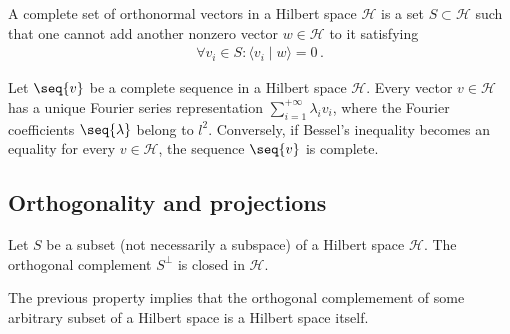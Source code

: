     \begin{adefinition}
        A complete set of orthonormal vectors in a Hilbert space $\mathcal{H}$ is a set $S\subset\mathcal{H}$ such that one cannot add another nonzero vector $w\in\mathcal{H}$ to it satisfying
        \begin{gather}
            \forall v_i\in S:\langle v_i\mid w\rangle = 0\,.
        \end{gather}
    \end{adefinition}

    \begin{theorem}[Parceval]
        Let $\seq{v}$ be a complete sequence in a Hilbert space $\mathcal{H}$. Every vector $v\in\mathcal{H}$ has a unique Fourier series representation $\sum_{i=1}^{+\infty}\lambda_iv_i$, where the Fourier coefficients $\seq{\lambda}$ belong to $l^2$. Conversely, if Bessel's inequality becomes an equality for every $v\in\mathcal{H}$, the sequence $\seq{v}$ is complete.
    \end{theorem}

\subsection{Orthogonality and projections}\label{section:orthogonal_projections}

    \begin{property}
        Let $S$ be a subset (not necessarily a subspace) of a Hilbert space $\mathcal{H}$. The orthogonal complement $S^\perp$ is closed in $\mathcal{H}$.
    \end{property}
    \begin{result}
        The previous property implies that the orthogonal complemement of some arbitrary subset of a Hilbert space is a Hilbert space itself.
    \end{result}

